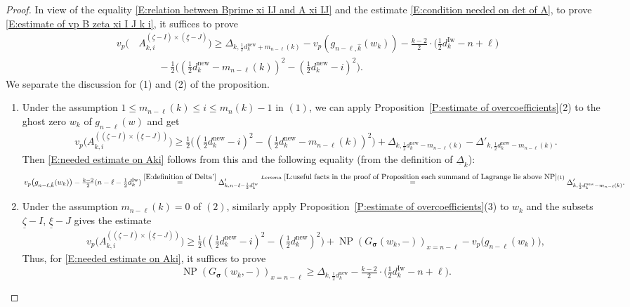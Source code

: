 \documentclass[12pt]{amsart}
\theoremstyle{definition}
\numberwithin{equation}{subsection}
\DeclareMathOperator{\NP}{NP}
\newcommand{\bbsigma}{\boldsymbol{\sigma}}
\newcommand{\new}{\mathrm{new}}
\newcommand{\Iw}{\mathrm{Iw}}
\begin{document}
\begin{proof}
In view of the equality \eqref{E:relation between Bprime xi IJ and A xi IJ} and the estimate \eqref{E:condition needed on det of A}, to prove \eqref{E:estimate of vp B zeta xi I J k i}, it suffices to prove
\begin{align}
\label{E:needed estimate on Aki}
v_p(\,&A_{k,i}^{(\underline \zeta - I) \times (\underline \xi-J)}) \geq \Delta_{k,\frac 12 d_k^\new + m_{n-\ell}(k)} - v_p(g_{n-\ell, \hat k}(w_k)) - \tfrac{k-2}2 \cdot \big( \tfrac 12d_k^\Iw-n+\ell\big) \\
\nonumber
& \qquad -\tfrac 12 \big((\tfrac 12 d_k^\new-m_{n-\ell}(k))^2-(\tfrac 12 d_k^\new-i)^2 \big).
\end{align}
We separate the discussion for (1) and (2) of the proposition.

\begin{enumerate}
\item Under the assumption $1\leq m_{n-\ell}(k)\leq i\leq m_n(k)-1$ in $(1)$,  we can apply Proposition~\ref{P:estimate of overcoefficients}(2) to the ghost zero $w_k$ of $g_{n-\ell}(w)$ and get
\begin{align*}		v_p\big(A_{k,i}^{((\underline\zeta-I)\times (\underline\xi-J))} \big)\geq \tfrac 12 \big( (\tfrac 12 d_k^\new-i)^2-(\tfrac 12 d_k^\new-m_{n-\ell}(k))^2\big)+\Delta_{k,\frac 12 d_k^\new-m_{n-\ell}(k)}-\Delta'_{k,\frac 12 d_k^\new-m_{n-\ell}(k)}.
\end{align*}
Then \eqref{E:needed estimate on Aki} follows from this and the following equality (from the definition of $\underline \Delta_k$):
\[
v_p\big(g_{n-\ell,\hat{k}}(w_k) \big) - \tfrac{k-2}2 (n-\ell-\tfrac 12 d_k^\Iw)\stackrel{\eqref{E:definition of Delta'}}= \Delta'_{k,n-\ell-\frac 12 d_k^\Iw}\stackrel{Lemma~\ref{L:useful facts in the proof of Proposition each summand of Lagrange lie above NP}(1)}=\Delta'_{k,\frac 12 d_k^\new-m_{n-\ell}(k)}.
\]
\item 
Under the assumption $m_{n-\ell}(k)=0$ of $(2)$, similarly apply Proposition~\ref{P:estimate of overcoefficients}(3) to $w_k$ and the subsets $\underline\zeta-I$, $\underline \xi-J$ gives the estimate
		\begin{align*}
		v_p\big(A_{k,i}^{((\underline \zeta-I)\times (\underline \xi-J))} \big) \geq \tfrac 12 \big( (\tfrac 12 d_k^\new-i)^2-(\tfrac 12 d_k^\new)^2 \big)+\NP(G_{\bbsigma}(w_{k},-))_{x=n-\ell}-v_p\big(g_{n-\ell}(w_k) \big),
		\end{align*}
Thus, for \eqref{E:needed estimate on Aki}, it suffices to prove
$$
\NP(G_{\bbsigma}(w_{k},-))_{x=n-\ell}\geq \Delta_{k,\frac 12 d_k^\new}-\tfrac{k-2}2 \cdot \big( \tfrac 12d_k^\Iw-n+\ell\big).
$$
\end{enumerate}
\end{proof}
\end{document}
